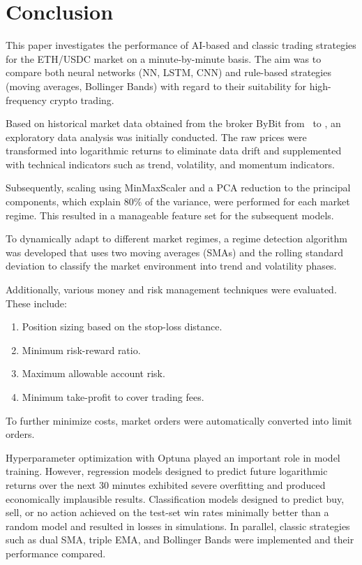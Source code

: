 \section{Conclusion}
\label{chap:conclusion}

This paper investigates the performance of AI-based and classic trading strategies for the ETH/USDC market on a minute-by-minute basis.
The aim was to compare both neural networks (NN, LSTM, CNN) and rule-based strategies (moving averages, Bollinger Bands) with regard to their suitability for high-frequency crypto trading.

Based on historical market data obtained from the broker ByBit from \ethDataStartDate~to \ethDataEndDate, an exploratory data analysis was initially conducted.
The raw prices were transformed into logarithmic returns to eliminate data drift and supplemented with technical indicators such as trend, volatility, and momentum indicators.

Subsequently, scaling using MinMaxScaler and a PCA reduction to the principal components, which explain 80\% of the variance, were performed for each market regime.
This resulted in a manageable feature set for the subsequent models.

To dynamically adapt to different market regimes, a regime detection algorithm was developed that uses two moving averages (SMAs) and the rolling standard deviation to classify the market environment into trend and volatility phases.

Additionally, various money and risk management techniques were evaluated.
These include:

\begin{enumerate}
    \item Position sizing based on the stop-loss distance.
    \item Minimum risk-reward ratio.
    \item Maximum allowable account risk.
    \item Minimum take-profit to cover trading fees.
\end{enumerate}

\noindent
To further minimize costs, market orders were automatically converted into limit orders.

Hyperparameter optimization with Optuna played an important role in model training.
However, regression models designed to predict future logarithmic returns over the next 30 minutes exhibited severe overfitting and produced economically implausible results.
Classification models designed to predict buy, sell, or no action achieved on the test-set win rates minimally better than a random model and resulted in losses in simulations.
In parallel, classic strategies such as dual SMA, triple EMA, and Bollinger Bands were implemented and their performance compared.


